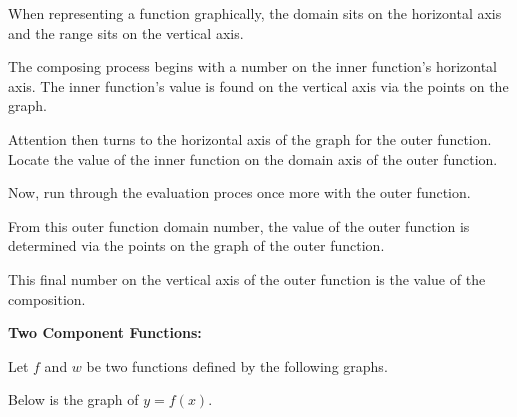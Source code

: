\documentclass{ximera}
\begin{document}
When representing a function graphically, the domain sits on the horizontal axis and the range sits on the vertical axis.

The composing process begins with a number on the inner function's horizontal axis. The inner function's value is found on the vertical axis via the points on the graph.

Attention then turns to the horizontal axis of the graph for the outer function. Locate the value of the inner function on the domain axis of the outer function.

Now, run through the evaluation proces once more with the outer function.

From this outer function domain number, the value of the outer function is determined via the points on the graph of the outer function.

This final number on the vertical axis of the outer function is the value of the composition.



\textbf{Two Component Functions:}


Let $f$ and $w$ be two functions defined by the following graphs.



Below is the graph of $y=f(x)$.  

\begin{image}
\end{image}
\end{document}
